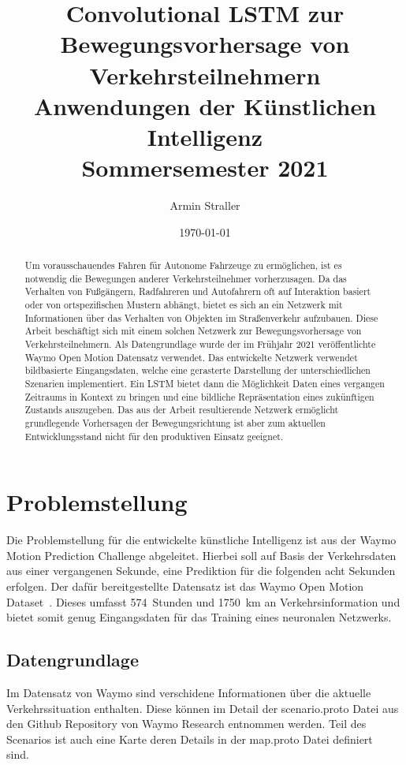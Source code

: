 \documentclass[12pt]{article}
\begin{document}
\title{%
Convolutional LSTM zur Bewegungsvorhersage von Verkehrsteilnehmern \\
  \large Anwendungen der Künstlichen Intelligenz \\
    Sommersemester 2021}
\author{Armin Straller}
\date{\today}

\maketitle

\begin{abstract}
    Um vorausschauendes Fahren für Autonome Fahrzeuge zu ermöglichen, ist es notwendig die Bewegungen anderer Verkehrsteilnehmer vorherzusagen. 
    Da das Verhalten von Fußgängern, Radfahreren und Autofahrern oft auf Interaktion basiert oder von ortspezifischen Mustern abhängt, 
    bietet es sich an ein Netzwerk mit Informationen über das Verhalten von Objekten im Straßenverkehr aufzubauen.
	Diese Arbeit beschäftigt sich mit einem solchen Netzwerk zur Bewegungsvorhersage von Verkehrsteilnehmern.
    Als Datengrundlage wurde der im Frühjahr 2021 veröffentlichte Waymo Open Motion Datensatz verwendet. 
    Das entwickelte Netzwerk verwendet bildbasierte Eingangsdaten, welche eine gerasterte Darstellung der unterschiedlichen Szenarien implementiert.
    Ein LSTM bietet dann die Möglichkeit Daten eines vergangen Zeitraums in Kontext zu bringen und eine bildliche Repräsentation eines zukünftigen Zustands auszugeben. 
    Das aus der Arbeit resultierende Netzwerk ermöglicht grundlegende Vorhersagen der Bewegungsrichtung ist aber zum aktuellen Entwicklungsstand nicht für den produktiven Einsatz geeignet.
\end{abstract}

\section{Problemstellung}
    Die Problemstellung für die entwickelte künstliche Intelligenz ist aus der Waymo Motion Prediction Challenge abgeleitet.
    Hierbei soll auf Basis der Verkehrsdaten aus einer vergangenen Sekunde, eine Prediktion für die folgenden acht Sekunden erfolgen.
    Der dafür bereitgestellte Datensatz ist das Waymo Open Motion Dataset~\cite{ettinger2021large}. 
    Dieses umfasst 574~Stunden und 1750~km an Verkehrsinformation und bietet somit genug Eingangsdaten für das Training eines neuronalen Netzwerks.

    \subsection{Datengrundlage}
        Im Datensatz von Waymo sind verschidene Informationen über die aktuelle Verkehrssituation enthalten. Diese können im Detail der scenario.proto Datei aus den Github Repository von Waymo Research entnommen werden.
        Teil des Scenarios ist auch eine Karte deren Details in der map.proto Datei definiert sind.~\cite{waymo2021github}
\end{document}
